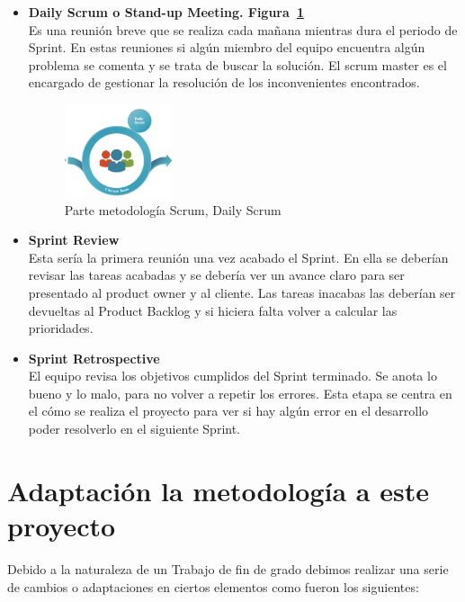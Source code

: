 \begin{itemize}
 
 
\item \textbf{Daily Scrum o Stand-up Meeting. Figura~\ref{fig:daily}}\\
Es una reunión breve que se realiza cada mañana mientras dura el periodo de Sprint. 
En estas reuniones si algún miembro del equipo encuentra algún problema  se comenta y se trata de buscar la solución. El scrum master es el encargado de gestionar la resolución de los inconvenientes encontrados.

\begin{figure}[H]
		\centering
		\includegraphics[width=0.3\textwidth] {daily.png}
		\caption{Parte metodología Scrum, Daily Scrum }\label{fig:daily}
	\end{figure} 

\item\textbf{ Sprint Review}\\
Esta sería la primera reunión una vez acabado el Sprint. En ella se deberían revisar las tareas acabadas y se debería ver un avance claro para ser presentado al product owner y al cliente. Las tareas inacabas las deberían ser devueltas al Product Backlog y si hiciera falta volver a calcular las prioridades.

 \item \textbf{Sprint Retrospective}\\
  El equipo revisa los objetivos cumplidos del Sprint terminado. Se anota lo bueno y lo malo, para no volver a repetir los errores. Esta etapa se centra en el cómo se realiza el proyecto para ver si hay algún error en el desarrollo poder resolverlo en el siguiente Sprint.
\end{itemize}



\section{Adaptación la metodología a este proyecto }
 Debido a la naturaleza de un Trabajo de fin de grado  debimos realizar una serie de cambios o adaptaciones en ciertos elementos como fueron los siguientes:
